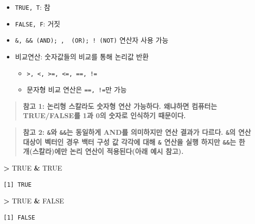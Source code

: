 \documentclass[11pt,a4paper]{book}
\newenvironment{Shaded}{\begin{snugshade}}{\end{snugshade}}
\newcommand{\StringTok}[1]{\textcolor[rgb]{0.31,0.60,0.02}{#1}}
\newcommand{\OtherTok}[1]{\textcolor[rgb]{0.56,0.35,0.01}{#1}}
\newcommand{\OperatorTok}[1]{\textcolor[rgb]{0.81,0.36,0.00}{\textbf{#1}}}
\providecommand{\tightlist}{%
  \setlength{\itemsep}{0pt}\setlength{\parskip}{0pt}}
\theoremstyle{definition}
\theoremstyle{definition}
\theoremstyle{definition}
\theoremstyle{remark}
\begin{document}
\begin{itemize}
\tightlist
\item
  \texttt{TRUE,\ T}: 참
\item
  \texttt{FALSE,\ F}: 거짓
\item
  \texttt{\&,\ \&\&\ (AND);\ \textbar{},\ \textbar{}\textbar{}\ (OR);\ !\ (NOT)}
  연산자 사용 가능
\item
  비교연산: 숫자값들의 비교를 통해 논리값 반환

  \begin{itemize}
  \tightlist
  \item
    \texttt{\textgreater{},\ \textless{},\ \textgreater{}=,\ \textless{}=,\ ==,\ !=}
  \item
    문자형 비교 연산은 \texttt{==,\ !=}만 가능
  \end{itemize}
\end{itemize}

\begin{quote}
\textbf{참고 1: 논리형 스칼라도 숫자형 연산 가능하다. 왜냐하면 컴퓨터는
TRUE/FALSE를 1과 0의 숫자로 인식하기 때문이다.}
\end{quote}

\begin{quote}
\textbf{참고 2: \texttt{\&}와 \texttt{\&\&}는 동일하게 AND를 의미하지만
연산 결과가 다르다. \texttt{\&}의 연산 대상이 벡터인 경우 백터 구성 값
각각에 대해 \texttt{\&} 연산을 실행 하지만 \texttt{\&\&}는 한
개(스칼라)에만 논리 연산이 적용된다(아래 예시 참고).}
\end{quote}

\footnotesize

\begin{Shaded}
\begin{Highlighting}[]
\OperatorTok{>}\StringTok{ }\OtherTok{TRUE} \OperatorTok{&}\StringTok{ }\OtherTok{TRUE}
\end{Highlighting}
\end{Shaded}

\begin{verbatim}
[1] TRUE
\end{verbatim}

\begin{Shaded}
\begin{Highlighting}[]
\OperatorTok{>}\StringTok{ }\OtherTok{TRUE} \OperatorTok{&}\StringTok{ }\OtherTok{FALSE}
\end{Highlighting}
\end{Shaded}

\begin{verbatim}
[1] FALSE
\end{verbatim}
\end{document}
